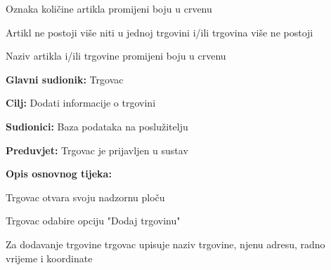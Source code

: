 \begin{packed_item}
\begin{packed_item}
						\item[] \begin{packed_enum}
							\item Oznaka količine artikla promijeni boju u crvenu
						\end{packed_enum}
						\item[6.b] Artikl ne postoji više niti u jednoj trgovini i/ili trgovina više ne postoji
						\item[] \begin{packed_enum}
							\item Naziv artikla i/ili trgovine promijeni boju u crvenu
						\end{packed_enum}
					\end{packed_item}
				\end{packed_item}
			
				
				\noindent {}
				\begin{packed_item}
					\item \textbf{Glavni sudionik:} Trgovac
					\item  \textbf{Cilj:} Dodati informacije o trgovini
					\item  \textbf{Sudionici:} Baza podataka na poslužitelju
					\item  \textbf{Preduvjet:} Trgovac je prijavljen u sustav
					\item  \textbf{Opis osnovnog tijeka:}
					\item[] \begin{packed_enum}
						\item Trgovac otvara svoju nadzornu ploču
						\item Trgovac odabire opciju "Dodaj trgovinu"
						\item Za dodavanje trgovine trgovac upisuje naziv trgovine, njenu adresu, radno vrijeme i koordinate
					\end{packed_enum}
				\end{packed_item}
			
